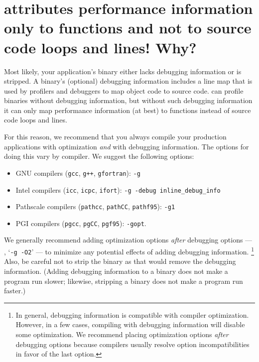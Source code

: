 \documentclass[11pt,letterpaper]{report}
\begin{document}

\section{\hpcviewer{} attributes performance information only to functions and not to source code loops and lines! Why?}
\label{sec:troubleshooting:debug-info}

Most likely, your application's binary either lacks debugging information or is stripped.
A binary's (optional) debugging information includes a line map that is used by profilers and debuggers to map object code to source code.
\HPCToolkit{} can profile binaries without debugging information, but without such debugging information it can only map performance information (at best) to functions instead of source code loops and lines.

For this reason, we recommend that you always compile your production applications with optimization \emph{and} with debugging information.
The options for doing this vary by compiler.
We suggest the following options:
\begin{itemize}
\item GNU compilers (\texttt{gcc}, \texttt{g++}, \texttt{gfortran}): \texttt{-g}
\item Intel compilers (\texttt{icc}, \texttt{icpc}, \texttt{ifort}): \texttt{-g -debug inline\_debug\_info}
\item Pathscale compilers (\texttt{pathcc}, \texttt{pathCC}, \texttt{pathf95}): \texttt{-g1}
\item PGI compilers (\texttt{pgcc}, \texttt{pgCC}, \texttt{pgf95}): \texttt{-gopt}.
\end{itemize}
We generally recommend adding optimization options \emph{after} debugging options --- \eg{}, `\texttt{-g -O2}' --- to minimize any potential effects of adding debugging information.%
\footnote{In general, debugging information is compatible with compiler optimization.
However, in a few cases, compiling with debugging information will disable some optimization.
We recommend placing optimization options \emph{after} debugging options because compilers usually resolve option incompatibilities in favor of the last option.}
Also, be careful not to strip the binary as that would remove the debugging information.
(Adding debugging information to a binary does not make a program run slower; likewise, stripping a binary does not make a program run faster.)
\end{document}
